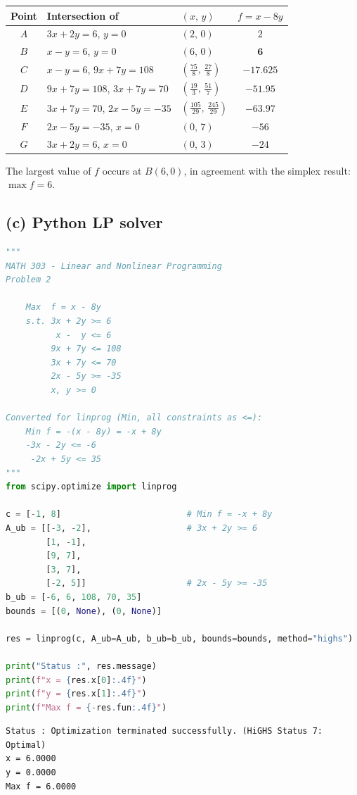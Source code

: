 \documentclass[11pt,a4paper]{article}
\begin{document}
\begin{center}\renewcommand{\arraystretch}{1.25}
\begin{tabular}{cllc}
\toprule
Point & Intersection of & $(x,\,y)$ & $f=x-8y$\\
\midrule
$A$ & $3x+2y=6$, $y=0$ & $(2,\,0)$ & $2$\\
\rowcolor{pivot}$B$ & $x-y=6$, $y=0$ & $(6,\,0)$ & $\mathbf{6}$\\
$C$ & $x-y=6$, $9x+7y=108$ & $\left(\tfrac{75}{8},\,\tfrac{27}{8}\right)$ & $-17.625$\\
$D$ & $9x+7y=108$, $3x+7y=70$ & $\left(\tfrac{19}{3},\,\tfrac{51}{7}\right)$ & $-51.95$\\
$E$ & $3x+7y=70$, $2x-5y=-35$ & $\left(\tfrac{105}{29},\,\tfrac{245}{29}\right)$ & $-63.97$\\
$F$ & $2x-5y=-35$, $x=0$ & $(0,\,7)$ & $-56$\\
$G$ & $3x+2y=6$, $x=0$ & $(0,\,3)$ & $-24$\\
\bottomrule
\end{tabular}\end{center}
The largest value of $f$ occurs at $B(6,0)$, in agreement with the simplex result: $\max f=6$.

\subsection*{(c) Python LP solver}
\begin{lstlisting}[language=Python]
"""
MATH 303 - Linear and Nonlinear Programming
Problem 2

    Max  f = x - 8y
    s.t. 3x + 2y >= 6
          x -  y <= 6
         9x + 7y <= 108
         3x + 7y <= 70
         2x - 5y >= -35
         x, y >= 0

Converted for linprog (Min, all constraints as <=):
    Min f = -(x - 8y) = -x + 8y
    -3x - 2y <= -6
     -2x + 5y <= 35
"""
from scipy.optimize import linprog

c = [-1, 8]                         # Min f = -x + 8y
A_ub = [[-3, -2],                   # 3x + 2y >= 6
        [1, -1],
        [9, 7],
        [3, 7],
        [-2, 5]]                    # 2x - 5y >= -35
b_ub = [-6, 6, 108, 70, 35]
bounds = [(0, None), (0, None)]

res = linprog(c, A_ub=A_ub, b_ub=b_ub, bounds=bounds, method="highs")

print("Status :", res.message)
print(f"x = {res.x[0]:.4f}")
print(f"y = {res.x[1]:.4f}")
print(f"Max f = {-res.fun:.4f}")
\end{lstlisting}
\begin{lstlisting}[style=out]
Status : Optimization terminated successfully. (HiGHS Status 7: Optimal)
x = 6.0000
y = 0.0000
Max f = 6.0000
\end{lstlisting}
\end{document}
